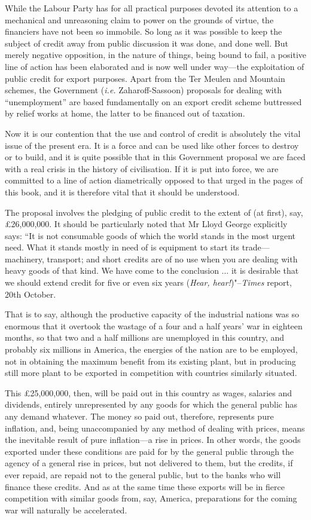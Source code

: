 \documentclass{book}
\begin{document}
While the Labour Party has for all practical purposes devoted its attention to a mechanical and unreasoning claim to power on the grounds of virtue, the financiers have not been so immobile. So long as it was possible to keep the subject of credit away from public discussion it was done, and done well. But merely negative opposition, in the nature of things, being bound to fail, a positive line of action has been elaborated and is now well under way—the exploitation of public credit for export purposes. Apart from the Ter Meulen and Mountain schemes, the Government (\emph{i.e.} Zaharoff-Sassoon) proposals for dealing with “unemployment” are based fundamentally on an export credit scheme buttressed by relief works at home, the latter to be financed out of taxation.

Now it is our contention that the use and control of credit is absolutely the vital issue of the present era. It is a force and can be used like other forces to destroy or to build, and it is quite possible that in this Government proposal we are faced with a real crisis in the history of civilisation. If it is put into force, we are committed to a line of action diametrically opposed to that urged in the pages of this book, and it is therefore vital that it should be understood.

The proposal involves the pledging of public credit to the extent of (at first), say, £26,000,000. It should be particularly noted that Mr Lloyd George explicitly says: “It is not consumable goods of which the world stands in the most urgent need. What it stands mostly in need of is equipment to start its trade—machinery, transport; and short credits are of no use when you are dealing with heavy goods of that kind. We have come to the conclusion ... it is desirable that we should extend credit for five or even six years (\emph{Hear, hear!})"–\emph{Times} report, 20th October.

That is to say, although the productive capacity of the industrial nations was so enormous that it overtook the wastage of a four and a half years’ war in eighteen months, so that two and a half millions are unemployed in this country, and probably six millions in America, the energies of the nation are to be employed, not in obtaining the maximum benefit from its existing plant, but in producing still more plant to be exported in competition with countries similarly situated.

This £25,000,000, then, will be paid out in this country as wages, salaries and dividends, entirely unrepresented by any goods for which the general public has any demand whatever. The money so paid out, therefore, represents pure inflation, and, being unaccompanied by any method of dealing with prices, means the inevitable result of pure inflation—a rise in prices. In other words, the goods exported under these conditions are paid for by the general public through the agency of a general rise in prices, but not delivered to them, but the credits, if ever repaid, are repaid not to the general public, but to the banks who will finance these credits. And as at the same time these exports will be in fierce competition with similar goods from, say, America, preparations for the coming war will naturally be accelerated.
\end{document}
